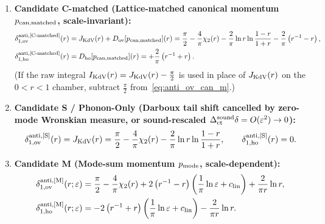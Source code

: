 \documentclass[11pt,a4paper]{article}
\begin{document}
\begin{enumerate}
\item \textbf{Candidate C-matched (Lattice-matched canonical momentum $p_{\rm can,matched}$, scale-invariant):}
\begin{align}
\delta_{1,\rm ov}^{\rm anti,[C\text{-matched}]}(r)&=J_{\rm KdV}(r)+D_{\rm ov}[p_{\rm can,matched}](r)
=\frac{\pi}{2}-\frac{4}{\pi}\chi_2(r)-\frac{2}{\pi}\ln r\ln\frac{1-r}{1+r}-\frac{2}{\pi}\left(r^{-1}-r\right),\label{eq:anti_ov_can_m}\\
\delta_{1,\rm ho}^{\rm anti,[C\text{-matched}]}(r)&=D_{\rm ho}[p_{\rm can,matched}](r)=+\frac{2}{\pi}\left(r^{-1}+r\right).\label{eq:anti_ho_can_m}
\end{align}
(If the raw integral $I_{\rm KdV}(r)=J_{\rm KdV}(r)-\frac{\pi}{2}$ is used in place of $J_{\rm KdV}(r)$ on the $0<r<1$ chamber, subtract $\frac{\pi}{2}$ from~\eqref{eq:anti_ov_can_m}.)
\item \textbf{Candidate S / Phonon-Only (Darboux tail shift cancelled by zero-mode Wronskian measure, or sound-rescaled $\Delta_{\rm ct}^{\rm sound}\delta=O(\varepsilon^2)\to 0$):}
\begin{equation}\label{eq:anti_sound}
\delta_{1,\rm ov}^{\rm anti,[S]}(r)=J_{\rm KdV}(r)=\frac{\pi}{2}-\frac{4}{\pi}\chi_2(r)-\frac{2}{\pi}\ln r\ln\frac{1-r}{1+r},\qquad
\delta_{1,\rm ho}^{\rm anti,[S]}(r)=0.
\end{equation}
\item \textbf{Candidate M (Mode-sum momentum $p_{\rm mode}$, scale-dependent):}
\begin{align}
\delta_{1,\rm ov}^{\rm anti,[M]}(r;\varepsilon)&=\frac{\pi}{2}-\frac{4}{\pi}\chi_2(r)+2\left(r^{-1}-r\right)\left(\frac{1}{\pi}\ln\varepsilon+c_{\rm lin}\right)+\frac{2}{\pi r}\ln r,\label{eq:anti_ov_mode}\\
\delta_{1,\rm ho}^{\rm anti,[M]}(r;\varepsilon)&=-2\left(r^{-1}+r\right)\left(\frac{1}{\pi}\ln\varepsilon+c_{\rm lin}\right)-\frac{2}{\pi r}\ln r.\label{eq:anti_ho_mode}
\end{align}
\end{enumerate}
\end{document}
